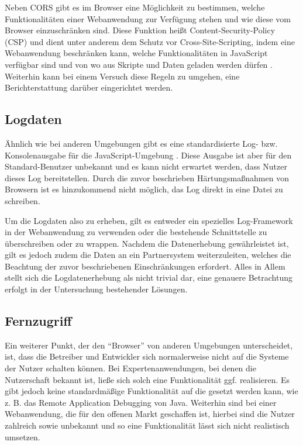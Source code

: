 Neben CORS gibt es im Browser eine Möglichkeit zu bestimmen, welche Funktionalitäten einer Webanwendung zur Verfügung stehen und wie diese vom Browser einzuschränken sind. Diese Funktion heißt Content-Security-Policy (CSP) und dient unter anderem dem Schutz vor Cross-Site-Scripting, indem eine Webanwendung beschränken kann, welche Funktionalitäten in JavaScript verfügbar sind und von wo aus Skripte und Daten geladen werden dürfen \cite{MDNContentSecurityPolicy}. Weiterhin kann bei einem Versuch diese Regeln zu umgehen, eine Berichterstattung darüber eingerichtet werden.

\subsection{Logdaten}
\label{sec:logdaten}

Ähnlich wie bei anderen Umgebungen gibt es eine standardisierte Log- bzw. Konsolenausgabe für die JavaScript-Umgebung \cite{MDNConsole}. Diese Ausgabe ist aber für den Standard-Benutzer unbekannt und es kann nicht erwartet werden, dass Nutzer dieses Log bereitstellen. Durch die zuvor beschrieben Härtungsmaßnahmen von Browsern ist es hinzukommend nicht möglich, das Log direkt in eine Datei zu schreiben.

Um die Logdaten also zu erheben, gilt es entweder ein spezielles Log-Framework in der Webanwendung zu verwenden oder die bestehende Schnittstelle zu überschreiben oder zu wrappen. Nachdem die Datenerhebung gewährleistet ist, gilt es jedoch zudem die Daten an ein Partnersystem weiterzuleiten, welches die Beachtung der zuvor beschriebenen Einschränkungen erfordert. Alles in Allem stellt sich die Logdatenerhebung als nicht trivial dar, eine genauere Betrachtung erfolgt in der Untersuchung bestehender Lösungen.

\subsection{Fernzugriff}

Ein weiterer Punkt, der den \enquote{Browser} von anderen Umgebungen unterscheidet, ist, dass die Betreiber und Entwickler sich normalerweise nicht auf die Systeme der Nutzer schalten können. Bei Expertenanwendungen, bei denen die Nutzerschaft bekannt ist, ließe sich solch eine Funktionalität ggf. realisieren. Es gibt jedoch keine standardmäßige Funktionalität auf die gesetzt werden kann, wie z. B. das Remote Application Debugging \cite{JavaDebugWireProtocol} von Java. Weiterhin sind bei einer Webanwendung, die für den offenen Markt geschaffen ist, hierbei sind die Nutzer zahlreich sowie unbekannt und so eine Funktionalität lässt sich nicht realistisch umsetzen.